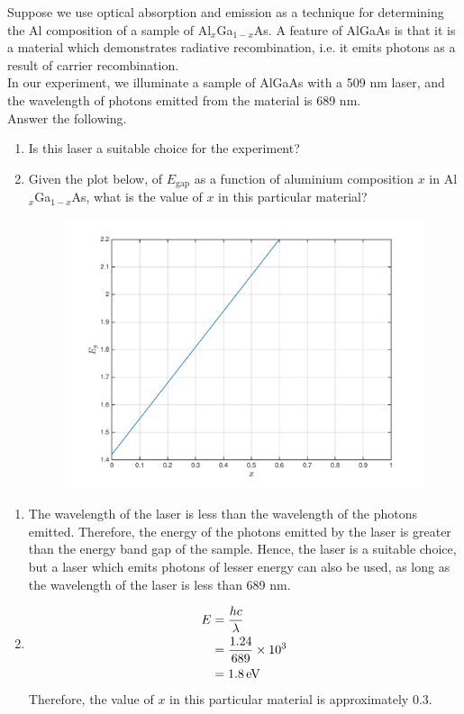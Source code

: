 \documentclass[fleqn, a4paper, 11pt, oneside]{amsart}
\theoremstyle{definition}
\theoremstyle{theorem}
\begin{document}
\begin{question}
	Suppose we use optical absorption and emission as a technique for determining the Al composition of a sample of Al$_x$Ga$_{1 - x}$As.
	A feature of AlGaAs is that it is a material which demonstrates radiative recombination, i.e. it emits photons as a result of carrier recombination.\\
	In our experiment, we illuminate a sample of AlGaAs with a 509 \si{\nano\metre} laser, and the wavelength of photons emitted from the material is 689 \si{\nano\metre}.\\
	Answer the following.
	\begin{enumerate}
		\item
			Is this laser a suitable choice for the experiment?
		\item
			Given the plot below, of $E_{\text{gap}}$ as a function of aluminium composition $x$ in Al$_x$Ga$_{1 - x}$As, what is the value of $x$ in this particular material?
			\begin{figure}[H]
				\centering
				\includegraphics[width = \textwidth]{plot1.pdf}
			\end{figure}
	\end{enumerate}
\end{question}

\begin{solution}
	\begin{enumerate}[leftmargin=*]
		\item
			The wavelength of the laser is less than the wavelength of the photons emitted.
			Therefore, the energy of the photons emitted by the laser is greater than the energy band gap of the sample.
			Hence, the laser is a suitable choice, but a laser which emits photons of lesser energy can also be used, as long as the wavelength of the laser is less than 689 \si{\nano\metre}.
		\item
			\begin{align*}
				E &= \frac{h c}{\lambda}\\
				&= \frac{1.24}{689} \times 10^3\\
				&= 1.8 \electronvolt
			\end{align*}
			Therefore, the value of $x$ in this particular material is approximately 0.3.
	\end{enumerate}
\end{solution}
\end{document}
